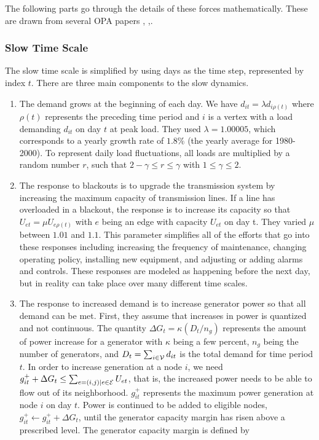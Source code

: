 The following parts go through the details of these forces mathematically.  These are drawn from several OPA papers \cite{dobson_2001}, \cite{carreras_2004},\cite{dobson_2007}.  

\subsubsection{Slow Time Scale}
The slow time scale is simplified by using days as the time step, represented by index $t$.  There are three main components to the slow dynamics.
\begin{enumerate}
\item The demand grows at the beginning of each day.  We have $d_{it} = \lambda d_{i \rho(t)}$ where $\rho(t)$ represents the preceding time period and $i$ is a vertex with a load demanding $d_{it}$ on day $t$ at peak load.  They used $\lambda = 1.00005$, which corresponds to a yearly growth rate of $1.8\%$ (the yearly average for 1980-2000).  To represent daily load fluctuations, all loads are multiplied by a random number $r$, such that $2-\gamma \le r \le \gamma$ with $1 \le \gamma \le 2$.
\item The response to blackouts is to upgrade the transmission system by increasing the maximum capacity of transmission lines.  If a line has overloaded in a blackout, the response is to increase its capacity so that $U_{et} = \mu U_{e \rho(t)}$ with $e$ being an edge with capacity $U_{et}$ on day t.  They varied $\mu$ between $1.01$ and  $1.1$.  This parameter simplifies all of the efforts that go into these responses including increasing the frequency of maintenance, changing operating policy, installing new equipment, and adjusting or adding alarms and controls.  These responses are modeled as happening before the next day, but in reality can take place over many different time scales.
\item The response to increased demand is to increase generator power so that all demand can be met.  First, they assume that increases in power is quantized and not continuous.  The quantity $\Delta G_t = \kappa ( D_t / n_g )$ represents the amount of power increase for a generator with $\kappa$ being a few percent, $n_g$ being the number of generators, and $D_t = \sum_{i \in \mathcal{V}} d_{it}$ is the total demand for time period $t$.  In order to increase generation at a node $i$, we need $g_{it}^+ + \Delta G_t \le \sum_{e=(i,j) | e \in \mathcal{E}} U_{et}$, that is, the increased power needs to be able to flow out of its neighborhood.  $g_{it}^+$ represents the maximum power generation at node $i$ on day $t$.  Power is continued to be added to eligible nodes, $g_{it}^+ \leftarrow g_{it}^ + + \Delta G_t$, until the generator capacity margin has risen above a prescribed level.  The generator capacity margin is defined by

\end{enumerate}
